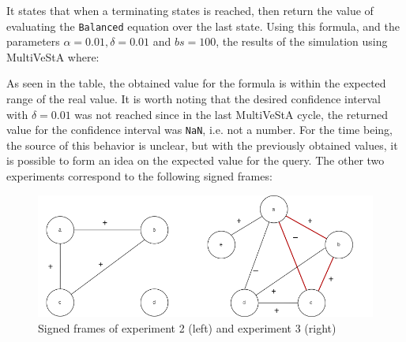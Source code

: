 It states that when a terminating states is reached, then return the value of evaluating the \texttt{Balanced} equation over the last state. Using this formula, and the parameters $\alpha = 0.01, \delta = 0.01$ and $bs = 100$, the results of the simulation using MultiVeStA where:

\begin{table}[H]
\centering
{}
\end{table}

As seen in the table, the obtained value for the formula is within the expected range of the real value. It is worth noting that the desired confidence interval with $\delta = 0.01$ was not reached since in the last MultiVeStA cycle, the returned value for the confidence interval was \texttt{NaN}, i.e. not a number. For the time being, the source of this behavior is unclear, but with the previously obtained values, it is possible to form an idea on the expected value for the query. The other two experiments correspond to the following signed frames:

\begin{figure}[H]
    \centering
    \includegraphics[scale = 0.5]{images/CS14.png}
    \caption{Signed frames of experiment 2 (left) and experiment 3 (right)}
    \label{fig:CS14}
\end{figure}

